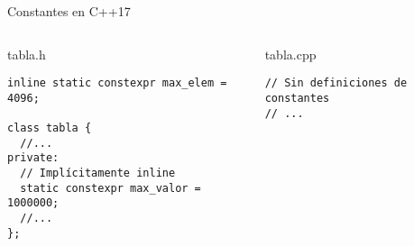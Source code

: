 \begin{frame}[t,fragile]{Constantes en C++17}
\begin{columns}[T]


\begin{block}{tabla.h}
\begin{lstlisting}
inline static constexpr max_elem = 4096;

class tabla {
  //...
private:
  // Implícitamente inline
  static constexpr max_valor = 1000000;
  //...
};
\end{lstlisting}
\end{block}

\begin{block}{tabla.cpp}
\begin{lstlisting}
// Sin definiciones de constantes
// ...
\end{lstlisting}
\end{block}
 
\end{columns}
\end{frame}


